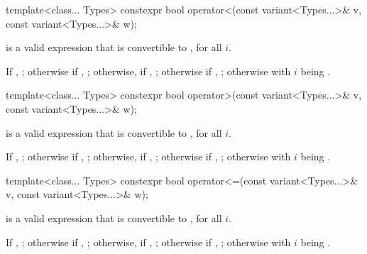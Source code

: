 %
\begin{itemdecl}
template<class... Types>
  constexpr bool operator<(const variant<Types...>& v, const variant<Types...>& w);
\end{itemdecl}

\begin{itemdescr}
\pnum
\mandates
{} is a valid expression that is
convertible to , for all $i$.

\pnum
\returns
If , ;
otherwise if , ;
otherwise, if , ;
otherwise if , ;
otherwise  with $i$ being .
\end{itemdescr}

%
\begin{itemdecl}
template<class... Types>
  constexpr bool operator>(const variant<Types...>& v, const variant<Types...>& w);
\end{itemdecl}

\begin{itemdescr}
\pnum
\mandates
{} is a valid expression that is
convertible to , for all $i$.

\pnum
\returns
If , ;
otherwise if , ;
otherwise, if , ;
otherwise if , ;
otherwise  with $i$ being .
\end{itemdescr}

%
\begin{itemdecl}
template<class... Types>
  constexpr bool operator<=(const variant<Types...>& v, const variant<Types...>& w);
\end{itemdecl}

\begin{itemdescr}
\pnum
\mandates
{} is a valid expression that is
convertible to , for all $i$.

\pnum
\returns
If , ;
otherwise if , ;
otherwise, if , ;
otherwise if , ;
otherwise  with $i$ being .
\end{itemdescr}

